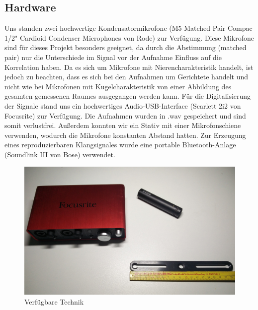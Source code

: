 \subsection{Hardware}
Uns standen zwei hochwertige Kondensatormikrofone (M5 Matched Pair Compac 1/2" Cardioid Condenser Microphones von Rode) zur Verfügung. Diese Mikrofone sind für dieses Projekt besonders geeignet, da durch die Abstimmung (matched pair) nur die Unterschiede im Signal vor der Aufnahme Einfluss auf die Korrelation haben. Da es sich um Mikrofone mit Nierencharakteristik handelt, ist jedoch zu beachten, dass es sich bei den Aufnahmen um Gerichtete handelt und nicht wie bei Mikrofonen mit Kugelcharakteristik von einer Abbildung des gesamten gemessenen Raumes ausgegangen werden kann. Für die Digitalisierung der Signale stand uns ein hochwertiges Audio-USB-Interface (Scarlett 2i2 von Focusrite) zur Verfügung. Die Aufnahmen wurden in .wav gespeichert und sind somit verlustfrei. Außerdem konnten wir ein Stativ mit einer Mikrofonschiene verwenden, wodurch die Mikrofone konstanten Abstand hatten. Zur Erzeugung eines reproduzierbaren Klangsignales wurde eine portable Bluetooth-Anlage (Soundlink III von Bose) verwendet.
\begin{figure}[ht!]
  \centering
  \includegraphics[width=\textwidth]{img/Equipment}
  \caption{Verfügbare Technik}
  \label{material}
\end{figure}
